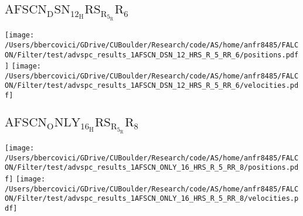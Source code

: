 \subsection{$\mathrm{AFSCN_DSN_12_HRS_R_5_RR_6}$}
\texttt{[image: /Users/bbercovici/GDrive/CUBoulder/Research/code/AS/home/anfr8485/FALCON/Filter/test/advspc\_results\_1AFSCN\_DSN\_12\_HRS\_R\_5\_RR\_6/positions.pdf]}
\texttt{[image: /Users/bbercovici/GDrive/CUBoulder/Research/code/AS/home/anfr8485/FALCON/Filter/test/advspc\_results\_1AFSCN\_DSN\_12\_HRS\_R\_5\_RR\_6/velocities.pdf]}
\subsection{$\mathrm{AFSCN_ONLY_16_HRS_R_5_RR_8}$}
\texttt{[image: /Users/bbercovici/GDrive/CUBoulder/Research/code/AS/home/anfr8485/FALCON/Filter/test/advspc\_results\_1AFSCN\_ONLY\_16\_HRS\_R\_5\_RR\_8/positions.pdf]}
\texttt{[image: /Users/bbercovici/GDrive/CUBoulder/Research/code/AS/home/anfr8485/FALCON/Filter/test/advspc\_results\_1AFSCN\_ONLY\_16\_HRS\_R\_5\_RR\_8/velocities.pdf]}
